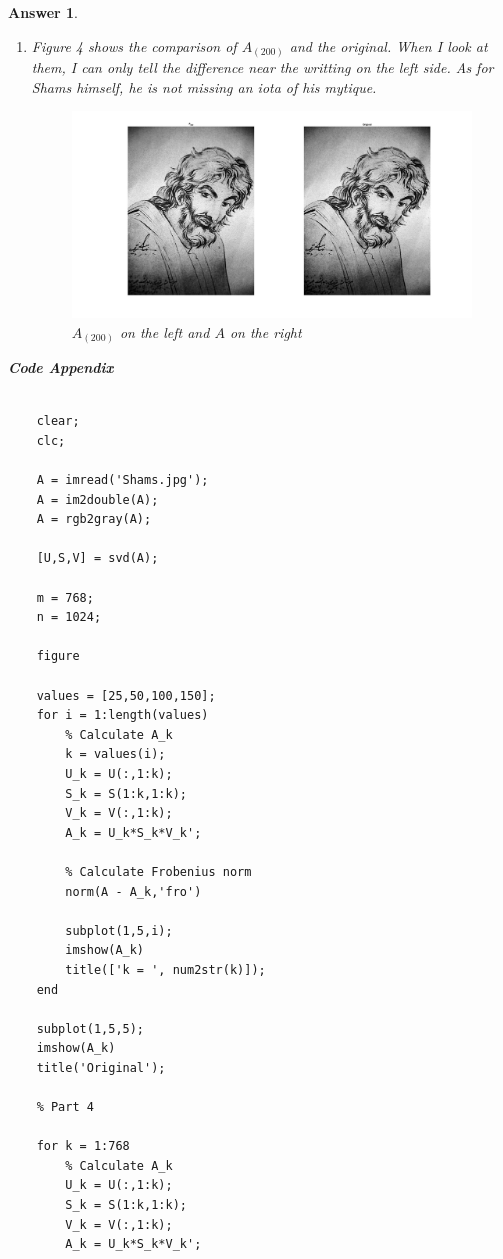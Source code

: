 \documentclass[12pt]{article}
\theoremstyle{colon}
\newtheorem*{answer}{Answer}
\begin{document}
\begin{answer}
\begin{enumerate}[label=\arabic*)]
    \item Figure 4 shows the comparison of $A_{(200)}$ and the original. When I look at them, I can only tell the difference near the writting on the left side. As for Shams himself, he is not missing an iota of his mytique.
      \begin{figure}[ht]
        \caption{$A_{(200)}$ on the left and $A$ on the right}
        \centering
          \includegraphics[width=\textwidth]{part5.jpg}
      \end{figure}
  \end{enumerate}

  \textbf{Code Appendix}

  \begin{lstlisting}[style=Matlab-editor, basicstyle=\scriptsize]
    % Part 3

    clear;
    clc;

    A = imread('Shams.jpg');
    A = im2double(A);
    A = rgb2gray(A);

    [U,S,V] = svd(A);

    m = 768;
    n = 1024;

    figure

    values = [25,50,100,150];
    for i = 1:length(values)
        % Calculate A_k
        k = values(i);
        U_k = U(:,1:k);
        S_k = S(1:k,1:k);
        V_k = V(:,1:k);
        A_k = U_k*S_k*V_k';

        % Calculate Frobenius norm
        norm(A - A_k,'fro')

        subplot(1,5,i);
        imshow(A_k)
        title(['k = ', num2str(k)]);
    end

    subplot(1,5,5);
    imshow(A_k)
    title('Original');

    % Part 4

    for k = 1:768
        % Calculate A_k
        U_k = U(:,1:k);
        S_k = S(1:k,1:k);
        V_k = V(:,1:k);
        A_k = U_k*S_k*V_k';


\end{lstlisting}
\end{answer}
\end{document}
